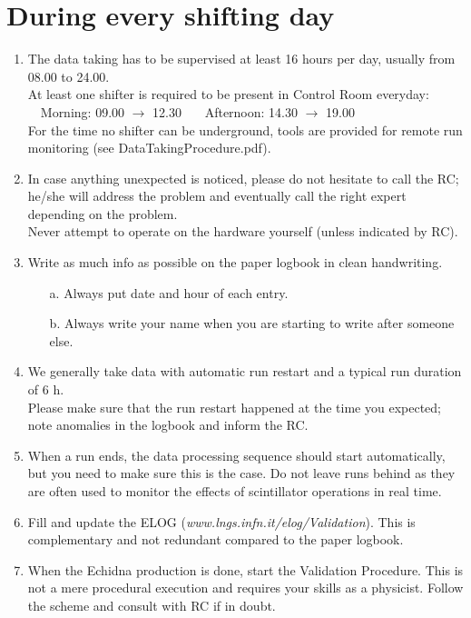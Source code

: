\documentclass[a4paper,11pt]{article}
\begin{document}
\section*{During every shifting day}
\begin{enumerate}
\item The data taking has to be supervised at least 16 hours per day, usually from 08.00 to 24.00. \\
At least one shifter is required to be present in Control Room everyday: \\
~~Morning: 09.00 $\rightarrow$ 12.30 ~~~Afternoon: 14.30 $\rightarrow$ 19.00 \\
For the time no shifter can be underground, tools are provided for remote run monitoring (see DataTakingProcedure.pdf).

\item In case anything unexpected is noticed, please do not hesitate to call the RC; he/she will address the problem 
and eventually call the right expert depending on the problem.\\
Never attempt to operate on the hardware yourself (unless indicated by RC).

\item Write as much info as possible on the paper logbook in clean handwriting.
\begin{itemize}
 \item[a. ] Always put date and hour of each entry.
 \item[b. ] Always write your name when you are starting to write after someone else.
\end{itemize}

\item We generally take data with automatic run restart and a typical run duration of 6 h. \\
Please make sure that the run restart happened at the time you expected; note anomalies in the logbook and inform the RC.

\item When a run ends, the data processing sequence should start automatically, but you need to make sure this is the case. 
Do not leave runs behind as they are often used to monitor the effects of scintillator operations in real time.

\item Fill and update the ELOG (\textit{www.lngs.infn.it/elog/Validation}). 
This is complementary and not redundant compared to the paper logbook. 

\item When the Echidna production is done, start the Validation Procedure. 
This is not a mere procedural execution and requires your skills as a physicist. Follow the scheme and consult with RC if in doubt.


\end{enumerate}
\end{document}
